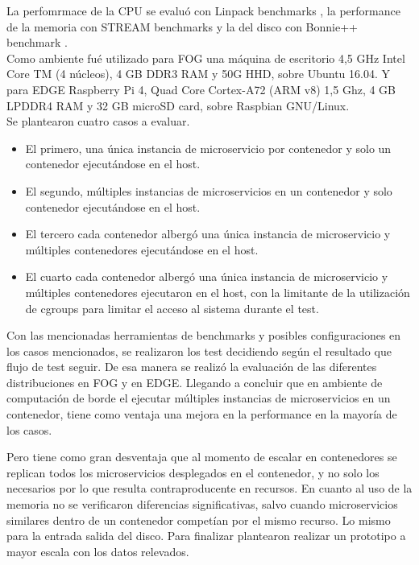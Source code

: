 La perfomrmace de la CPU se evaluó con Linpack benchmarks 
\cite{LINPACKBenchmarksWikipedia}, la performance de la memoria con STREAM benchmarks 
\cite{STREAMBenchmarkAMD} 
y la del disco con Bonnie++ benchmark \cite{BonnieWikipedia}.\\

 Como ambiente fué utilizado para FOG una máquina de escritorio 4,5 GHz Intel Core TM (4 núcleos),
 4 GB DDR3 RAM y 50G HHD, sobre Ubuntu 16.04. Y para EDGE Raspberry Pi 4, Quad Core Cortex-A72 (ARM v8) 1,5 Ghz,
 4 GB LPDDR4 RAM y 32 GB microSD card, sobre Raspbian GNU/Linux. \\

 Se plantearon cuatro casos a evaluar.\\
 \begin{itemize}
     \item El primero, una única instancia de microservicio por contenedor y solo un contenedor ejecutándose en el host.
     \item El segundo, múltiples instancias de microservicios en un contenedor y solo contenedor ejecutándose en el host. 
     \item El tercero cada contenedor albergó una única instancia de microservicio y múltiples contenedores ejecutándose en el host.
     \item El cuarto cada contenedor albergó una única instancia de microservicio y múltiples contenedores ejecutaron en el host, 
     con la limitante de la utilización de cgroups para limitar el acceso al sistema durante el test.
 \end{itemize}
 
 Con las mencionadas herramientas de benchmarks y posibles configuraciones en los casos mencionados,
 se realizaron los test decidiendo según el resultado que flujo de test seguir.
 De esa manera se realizó la evaluación de las diferentes distribuciones en FOG y en EDGE. 
 Llegando a concluir que en ambiente de computación de borde el ejecutar múltiples instancias de microservicios en un contenedor,
 tiene como ventaja una mejora en la performance en la mayoría de los casos.

 Pero tiene como gran desventaja que al momento de escalar en contenedores se replican todos los microservicios desplegados en el contenedor, 
 y no solo los necesarios por lo que resulta contraproducente en recursos. 
 En cuanto al uso de la memoria no se verificaron diferencias significativas, 
 salvo cuando microservicios similares dentro de un contenedor competían por el mismo recurso. 
 Lo mismo para la entrada salida del disco. Para finalizar plantearon realizar un prototipo a mayor escala con los datos relevados.
